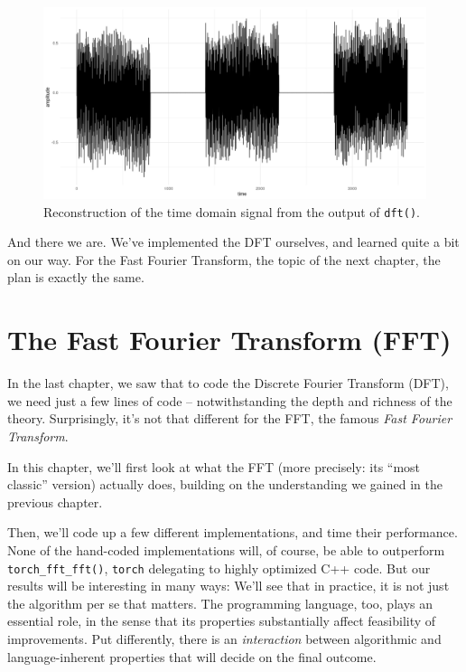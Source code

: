 \documentclass[
  letterpaper,
]{krantz}
\begin{document}
\begin{figure}[H]

{\centering \includegraphics{images/dft-dial-ifft.png}

}

\caption{\label{fig-dft-dial-ifft}Reconstruction of the time domain
signal from the output of \texttt{dft()}.}

\end{figure}

And there we are. We've implemented the DFT ourselves, and learned quite
a bit on our way. For the Fast Fourier Transform, the topic of the next
chapter, the plan is exactly the same.

\hypertarget{sec:signal-processing-2}{%
\chapter{The Fast Fourier Transform
(FFT)}\label{sec:signal-processing-2}}

In the last chapter, we saw that to code the Discrete Fourier Transform
(DFT), we need just a few lines of code -- notwithstanding the depth and
richness of the theory. Surprisingly, it's not that different for the
FFT, the famous \emph{Fast Fourier
Transform}.

In this chapter, we'll first look at what the FFT (more precisely: its
``most classic'' version) actually does, building on the understanding
we gained in the previous chapter.

Then, we'll code up a few different implementations, and time their
performance. None of the hand-coded implementations will, of course, be
able to outperform \texttt{torch\_fft\_fft()}, \texttt{torch} delegating
to highly optimized C++ code. But our results will be interesting in
many ways: We'll see that in practice, it is not just the algorithm per
se that matters. The programming language, too, plays an essential role,
in the sense that its properties substantially affect feasibility of
improvements. Put differently, there is an \emph{interaction} between
algorithmic and language-inherent properties that will decide on the
final outcome.
\end{document}
